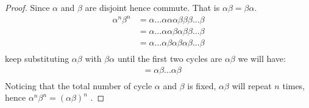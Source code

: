 \documentclass[12pt]{article}
\begin{document}
\begin{enumerate}
\begin{enumerate}[label=(\alph*)]
                \begin{proof}
                    Since $\alpha$ and $\beta$ are disjoint hence commute. That is $\alpha\beta = \beta\alpha$.
                    \begin{align*}
                        \alpha^n\beta^n &= \alpha... \alpha\alpha\alpha\beta\beta\beta...\beta \\
                        &= \alpha... \alpha\alpha\beta\alpha\beta\beta...\beta \\
                        &= \alpha... \alpha\beta\alpha\beta\alpha\beta...\beta \\
                    \end{align*}
                    keep substituting $\alpha\beta$ with $\beta\alpha$ until the first two cycles are $\alpha \beta$ we will have:\\
                    \begin{align*}
                        &= \alpha\beta...\alpha\beta \\
                    \end{align*}
                    Noticing that the total number of cycle $\alpha$ and $\beta$ is fixed, $\alpha\beta$ will repeat $n$ times, hence $\alpha^n\beta^n =  (\alpha\beta)^n$ .
                   

\end{proof}
\end{enumerate}
\end{enumerate}
\end{document}
